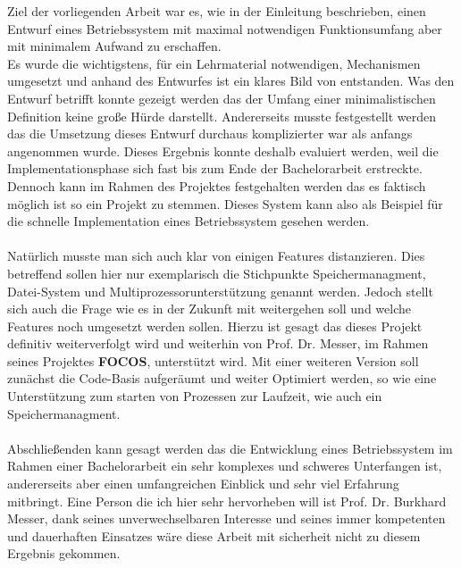 Ziel der vorliegenden Arbeit war es, wie in der Einleitung beschrieben, einen Entwurf eines Betriebssystem mit maximal notwendigen Funktionsumfang aber mit minimalem Aufwand zu erschaffen.\\
Es wurde die wichtigstens, f\"ur ein Lehrmaterial notwendigen, Mechanismen umgesetzt und anhand des Entwurfes ist ein klares Bild von \mops entstanden. Was den Entwurf betrifft konnte gezeigt werden das der Umfang einer minimalistischen Definition keine gro\ss e H\"urde darstellt. Andererseits musste festgestellt werden das die Umsetzung dieses Entwurf durchaus komplizierter war als anfangs angenommen wurde. Dieses Ergebnis konnte deshalb evaluiert werden, weil die Implementationsphase sich fast bis zum Ende der Bachelorarbeit erstreckte. Dennoch kann im Rahmen des Projektes festgehalten werden das es faktisch m\"oglich ist so ein Projekt zu stemmen. Dieses System kann also als Beispiel f\"ur die schnelle Implementation eines Betriebssystem gesehen werden.\\\\
Nat\"urlich musste man sich auch klar von einigen Features distanzieren. Dies betreffend sollen hier nur exemplarisch die Stichpunkte Speichermanagment, Datei-System und Multiprozessorunterst\"utzung genannt werden. Jedoch stellt sich auch die Frage wie es in der Zukunft mit \mops weitergehen soll und welche Features noch umgesetzt werden sollen. Hierzu ist gesagt das dieses Projekt definitiv weiterverfolgt wird und weiterhin von Prof. Dr. Messer, im Rahmen seines Projektes \textbf{FOCOS}, unterst\"utzt wird. Mit einer weiteren Version soll zun\"achst die Code-Basis aufger\"aumt und weiter Optimiert werden, so wie eine Unterst\"utzung zum starten von Prozessen zur Laufzeit, wie auch ein Speichermanagment.\\\\
Abschlie\ss enden kann gesagt werden das die Entwicklung eines Betriebssystem im Rahmen einer Bachelorarbeit ein sehr komplexes und schweres Unterfangen ist, andererseits aber einen umfangreichen Einblick und sehr viel Erfahrung mitbringt. Eine Person die ich hier sehr hervorheben will ist Prof. Dr. Burkhard Messer, dank seines unverwechselbaren Interesse und seines immer kompetenten und dauerhaften Einsatzes w\"are diese Arbeit mit sicherheit nicht zu diesem Ergebnis gekommen.
